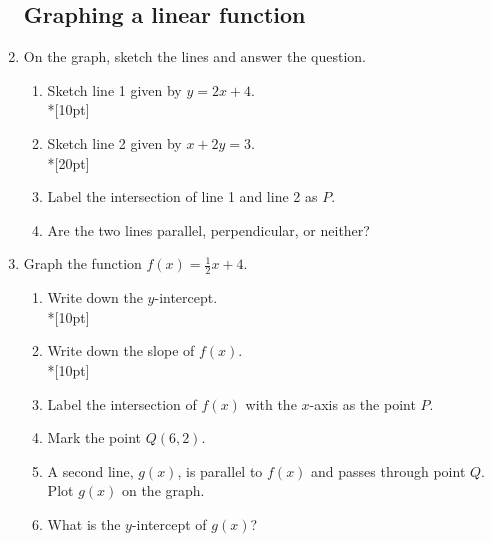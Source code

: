 \documentclass[12pt, oneside]{article}
\begin{document}
\begin{enumerate}
\subsection*{Graphing a linear function}
  \item   On the graph, sketch the lines and answer the question.
  \begin{enumerate}
      \item Sketch line 1 given by $y=2x+4$.\\*[10pt]
      \item Sketch line 2 given by $x+2y=3$.\\*[20pt]
      \item Label the intersection of line 1 and line 2 as $P$.
      \item Are the two lines parallel, perpendicular, or neither?

      \begin{center} %
      \end{center}

  \end{enumerate}


\newpage
\item Graph the function $f(x)=\frac{1}{2}x+4$.
\begin{enumerate}
    \item Write down the $y$-intercept.\\*[10pt]
    \item Write down the slope of $f(x)$.\\*[10pt]
    \item Label the intersection of $f(x)$ with the $x$-axis as the point $P$.
    \item Mark the point $Q (6, 2)$.
    \item A second line, $g(x)$, is parallel to $f(x)$ and passes through point $Q$. Plot $g(x)$ on the graph.
    \item What is the $y$-intercept of $g(x)$?
\end{enumerate}

\begin{center} %
\end{center}


\end{enumerate}
\end{document}
